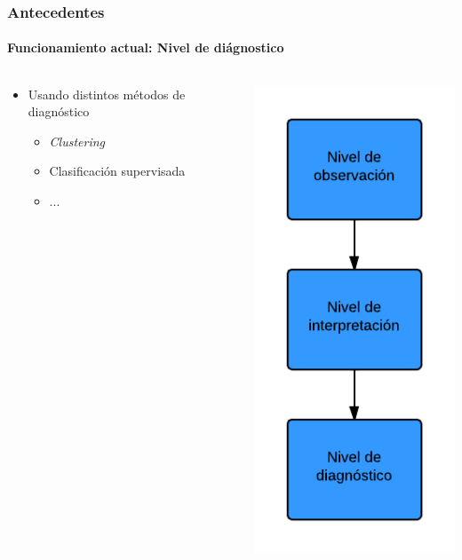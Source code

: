 \begin{frame}
	\frametitle{Antecedentes}
	\framesubtitle{Funcionamiento actual: Nivel de di\'agnostico}
	
	\begin{columns}[T] %
		\begin{column}[T]{5cm} %
			\begin{itemize}
				\item Usando distintos m\'etodos de diagn\'ostico
				\begin{itemize}
					\item \textit{Clustering}
					\item Clasificaci\'on supervisada
					\item ...
				\end{itemize}
			\end{itemize}
		\end{column}
		\begin{column}[T]{5cm} %
			\includegraphics[width=0.5\linewidth]{./Figures/NivelDeDiagnostico.png}
		\end{column}
	\end{columns}
\end{frame}

